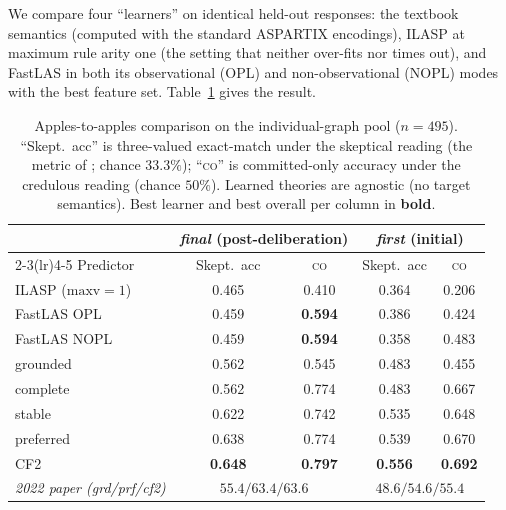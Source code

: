 \documentclass[11pt]{article}
\newcommand{\co}{\textsc{co}}
\newcommand{\best}[1]{\textbf{#1}}
\begin{document}
We compare four ``learners'' on identical held-out responses: the textbook semantics
(computed with the standard ASPARTIX encodings), ILASP at maximum rule arity one (the setting that
neither over-fits nor times out), and FastLAS in both its observational (OPL) and
non-observational (NOPL) modes with the best feature set. Table~\ref{tab:act1} gives the result.

\begin{table}[t]
\centering
\small
\caption{Apples-to-apples comparison on the individual-graph pool ($n{=}495$). ``Skept.\ acc'' is
three-valued exact-match under the skeptical reading (the metric of
\citeauthor{guillaume2022}; chance $33.3\%$); ``\co'' is committed-only accuracy under the
credulous reading (chance $50\%$). Learned theories are agnostic (no target semantics). Best
learner and best overall per column in \best{bold}.}
\label{tab:act1}
\begin{tabular}{lcccc}
\toprule
& \multicolumn{2}{c}{\emph{final} (post-deliberation)} & \multicolumn{2}{c}{\emph{first} (initial)}\\
\cmidrule(lr){2-3}\cmidrule(lr){4-5}
Predictor & Skept.\ acc & \co & Skept.\ acc & \co\\
\midrule
ILASP ($\text{maxv}{=}1$)      & 0.465 & 0.410 & 0.364 & 0.206\\
FastLAS OPL                    & 0.459 & \best{0.594} & 0.386 & 0.424\\
FastLAS NOPL                   & 0.459 & \best{0.594} & 0.358 & 0.483\\
\midrule
grounded                       & 0.562 & 0.545 & 0.483 & 0.455\\
complete                       & 0.562 & 0.774 & 0.483 & 0.667\\
stable                         & 0.622 & 0.742 & 0.535 & 0.648\\
preferred                      & 0.638 & 0.774 & 0.539 & 0.670\\
CF2                            & \best{0.648} & \best{0.797} & \best{0.556} & \best{0.692}\\
\midrule
\emph{2022 paper (grd/prf/cf2)}& \multicolumn{2}{c}{$55.4 / 63.4 / 63.6$} & \multicolumn{2}{c}{$48.6 / 54.6 / 55.4$}\\
\bottomrule
\end{tabular}
\end{table}
\end{document}
